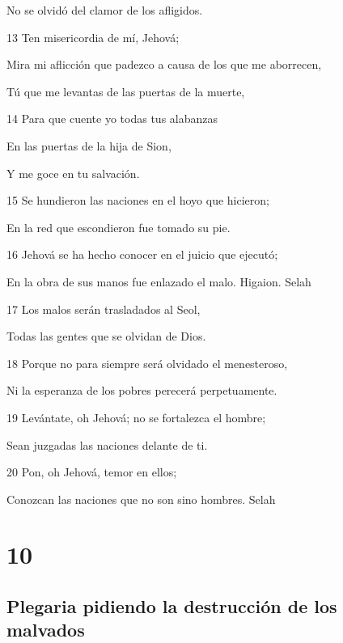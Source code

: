 \par No se olvidó del clamor de los afligidos.
\par 13 Ten misericordia de mí, Jehová;
\par Mira mi aflicción que padezco a causa de los que me aborrecen,
\par Tú que me levantas de las puertas de la muerte,
\par 14 Para que cuente yo todas tus alabanzas
\par En las puertas de la hija de Sion,
\par Y me goce en tu salvación.
\par 15 Se hundieron las naciones en el hoyo que hicieron;
\par En la red que escondieron fue tomado su pie.
\par 16 Jehová se ha hecho conocer en el juicio que ejecutó;
\par En la obra de sus manos fue enlazado el malo. Higaion. Selah
\par 17 Los malos serán trasladados al Seol,
\par Todas las gentes que se olvidan de Dios.
\par 18 Porque no para siempre será olvidado el menesteroso,
\par Ni la esperanza de los pobres perecerá perpetuamente.
\par 19 Levántate, oh Jehová; no se fortalezca el hombre;
\par Sean juzgadas las naciones delante de ti.
\par 20 Pon, oh Jehová, temor en ellos;
\par Conozcan las naciones que no son sino hombres. Selah

\chapter{10}

\section*{Plegaria pidiendo la destrucción de los malvados}


